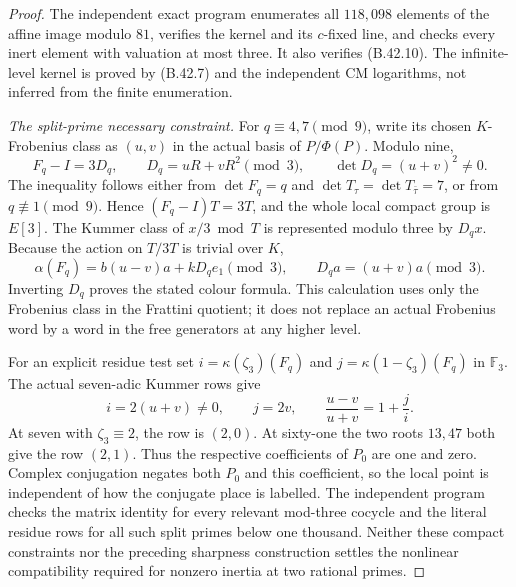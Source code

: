 \begin{proof}
The independent exact program 
enumerates all $118{,}098$ elements of the affine image modulo
$81$, verifies the kernel and its $c$-fixed line, and checks every
inert element with valuation at most three.  It also verifies
(B.42.10).  The infinite-level kernel is proved by (B.42.7)
and the independent CM logarithms, not inferred from the finite
enumeration.

\emph{The split-prime necessary constraint.}
For $q\equiv4,7\pmod9$, write its chosen $K$-Frobenius class
as $(u,v)$ in the actual basis of $P/\Phi(P)$.  Modulo nine,
\[
 F_q-I=3D_q,\qquad D_q=uR+vR^2\pmod3,
 \qquad\det D_q=(u+v)^2\ne0.                              \tag{B.42.11}
\]
The inequality follows either from $\det F_q=q$ and
$\det T_\tau=\det T_{\bar\tau}=7$, or from
$q\not\equiv1\pmod9$.  Hence $(F_q-I)T=3T$, and the
whole local compact group is $E[3]$.  The Kummer class of
$x/3\bmod T$ is represented modulo three by $D_qx$.
Because the action on $T/3T$ is trivial over $K$,
\[
 \alpha(F_q)=b(u-v)a+kD_qe_1\pmod3,
 \qquad D_qa=(u+v)a\pmod3.
\]
Inverting $D_q$ proves the stated colour formula.
This calculation uses only the Frobenius class in the Frattini
quotient; it does not replace an actual Frobenius word by a word
in the free generators at any higher level.

For an explicit residue test set
$i=\kappa(\zeta_3)(F_q)$ and
$j=\kappa(1-\zeta_3)(F_q)$ in $\mathbb F_3$.
The actual seven-adic Kummer rows give
\[
 i=2(u+v)\ne0,\qquad j=2v,
 \qquad\frac{u-v}{u+v}=1+\frac ji.                       \tag{B.42.12}
\]
At seven with $\zeta_3\equiv2$, the row is $(2,0)$.
At sixty-one the two roots $13,47$ both give the row $(2,1)$.
Thus the respective coefficients of $P_0$ are one and zero.
Complex conjugation negates both $P_0$ and this coefficient,
so the local point is independent of how the conjugate place is
labelled.  The independent program
 checks the matrix identity
for every relevant mod-three cocycle and the literal residue
rows for all such split primes below one thousand.
Neither these compact constraints nor the preceding sharpness
construction settles the nonlinear compatibility required for
nonzero inertia at two rational primes.
\end{proof}
